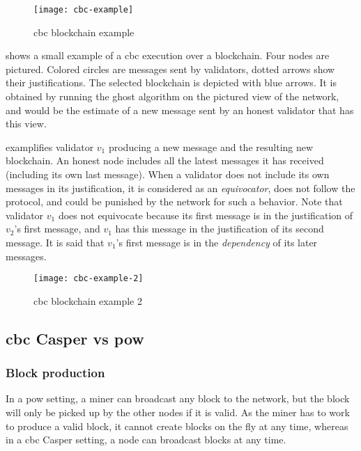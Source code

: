 \begin{figure}[h]
	\centering
	\texttt{[image: cbc-example]}
  \captionsetup{justification=centering}
    \caption{\gls{cbc} blockchain example}
	\label{fig:example}
\end{figure}

 shows a small example of a \gls{cbc} execution
over a blockchain. Four nodes are pictured. Colored circles are messages sent by
validators, dotted arrows show their justifications. The selected blockchain is
depicted with blue arrows. It is obtained by running the \gls{ghost} algorithm
on the pictured view of the network, and would be the estimate of a new message
sent by an honest validator that has this view.

 examplifies validator \(v_1\) producing a new message
and the resulting new blockchain. An honest node includes all the latest
messages it has received (including its own last message). When a validator does
not include its own messages in its justification, it is considered as an
\textit{equivocator}, does not follow the protocol, and could be punished by
the network for such a behavior. Note that validator \(v_1\) does not equivocate
because its first message is in the justification of \(v_2\)'s first message,
and \(v_1\) has this message in the justification of its second message. It is
said that \(v_1\)'s first message is in the \textit{dependency} of its later
messages.

\begin{figure}[h]
	\centering
	\texttt{[image: cbc-example-2]}
  \captionsetup{justification=centering}
    \caption{\gls{cbc} blockchain example 2}
	\label{fig:example2}
\end{figure}


\FloatBarrier
\subsection{\gls{cbc} Casper vs \gls{pow}}
\label{ssec:powVsPos}

\subsubsection{Block production}
In a \gls{pow} setting, a miner can broadcast any block to the network, but the
block will only be picked up by the other nodes if it is valid. As the miner has
to work to produce a valid block, it cannot create blocks on the fly at any
time, whereas in a \gls{cbc} Casper setting, a node can broadcast blocks at any
time. 

